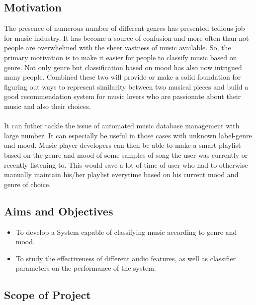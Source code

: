 \subsection{Motivation}
The presence of numerous number of different genres has presented tedious job for music industry. It has become
a source of confusion and more often than not people are overwhelmed with the sheer vastness of music available.
So, the primary motivation is to make it easier for people to classify music based on genre. Not only
genre but classification based on mood has also now intrigued many people. Combined these two will provide 
or make a solid foundation for figuring out ways to represent similarity between two musical pieces and build a good recommendation
system for music lovers who are passionate about their music and also their choices.\\
\\
It can futher tackle the issue of automated music database management with large number.  It can especially be useful 
in those cases with unknown label-genre and mood. Music player developers can then be able to make a smart playlist based on the genre 
and mood of some samples of song the user was currently or recently listening to. This would save a lot of time of user who had to
otherwise manually maintain his/her playlist everytime based on his current mood and genre of choice.

\subsection{Aims and Objectives}
\begin{itemize}
        \item To develop a System capable of classifying music according to genre and mood.
        \item To study the effectiveness of different audio features, as well as classifier parameters on the performance of the system.
\end{itemize}

\subsection{Scope of Project}

